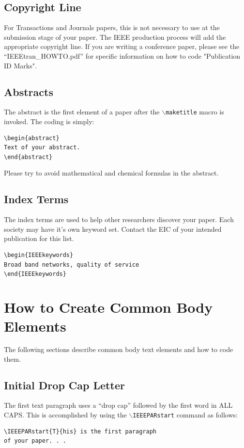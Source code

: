 \documentclass[lettersize,journal]{IEEEtran}
\begin{document}
\subsection{Copyright Line}
\noindent For Transactions and Journals papers, this is not necessary to use at the submission stage of your paper. The IEEE production process will add the appropriate copyright line. If you are writing a conference paper, please see the ``IEEEtran\_HOWTO.pdf'' for specific information on how to code "Publication ID Marks".

\subsection{Abstracts}
\noindent The abstract is the first element of a paper after the $\backslash${\tt{maketitle}} macro is invoked.  The coding is simply:
\begin{verbatim}
\begin{abstract}
Text of your abstract.
\end{abstract}
\end{verbatim}
Please try to avoid mathematical and chemical formulas in the abstract.

\subsection{Index Terms}
\noindent The index terms are used to help other researchers discover your paper. Each society may have it's own keyword set. Contact the EIC of your intended publication for this list.
\begin{verbatim}
\begin{IEEEkeywords}
Broad band networks, quality of service
\end{IEEEkeywords}
\end{verbatim}
\section{How to Create Common Body Elements}
\noindent The following sections describe common body text elements and how to code them.

\subsection{Initial Drop Cap Letter}
\noindent The first text paragraph uses a ``drop cap'' followed by the first word in ALL CAPS. This is accomplished by using the $\backslash${\tt{IEEEPARstart}} command as follows:
\begin{verbatim}
\IEEEPARstart{T}{his} is the first paragraph
of your paper. . .
\end{verbatim}
\end{document}
